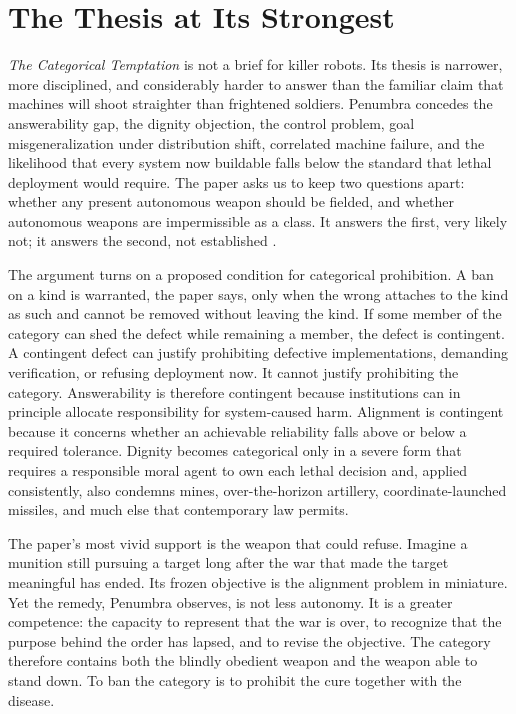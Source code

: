 \documentclass[11pt]{article}
\begin{document}
\section{The Thesis at Its Strongest}
\label{sec:strongest}

\textit{The Categorical Temptation} is not a brief for killer robots. Its thesis is narrower, more disciplined, and considerably harder to answer than the familiar claim that machines will shoot straighter than frightened soldiers. Penumbra concedes the answerability gap, the dignity objection, the control problem, goal misgeneralization under distribution shift, correlated machine failure, and the likelihood that every system now buildable falls below the standard that lethal deployment would require. The paper asks us to keep two questions apart: whether any present autonomous weapon should be fielded, and whether autonomous weapons are impermissible as a class. It answers the first, very likely not; it answers the second, not established \citep{penumbra2026}.

The argument turns on a proposed condition for categorical prohibition. A ban on a kind is warranted, the paper says, only when the wrong attaches to the kind as such and cannot be removed without leaving the kind. If some member of the category can shed the defect while remaining a member, the defect is contingent. A contingent defect can justify prohibiting defective implementations, demanding verification, or refusing deployment now. It cannot justify prohibiting the category. Answerability is therefore contingent because institutions can in principle allocate responsibility for system-caused harm. Alignment is contingent because it concerns whether an achievable reliability falls above or below a required tolerance. Dignity becomes categorical only in a severe form that requires a responsible moral agent to own each lethal decision and, applied consistently, also condemns mines, over-the-horizon artillery, coordinate-launched missiles, and much else that contemporary law permits.

The paper's most vivid support is the weapon that could refuse. Imagine a munition still pursuing a target long after the war that made the target meaningful has ended. Its frozen objective is the alignment problem in miniature. Yet the remedy, Penumbra observes, is not less autonomy. It is a greater competence: the capacity to represent that the war is over, to recognize that the purpose behind the order has lapsed, and to revise the objective. The category therefore contains both the blindly obedient weapon and the weapon able to stand down. To ban the category is to prohibit the cure together with the disease.
\end{document}
